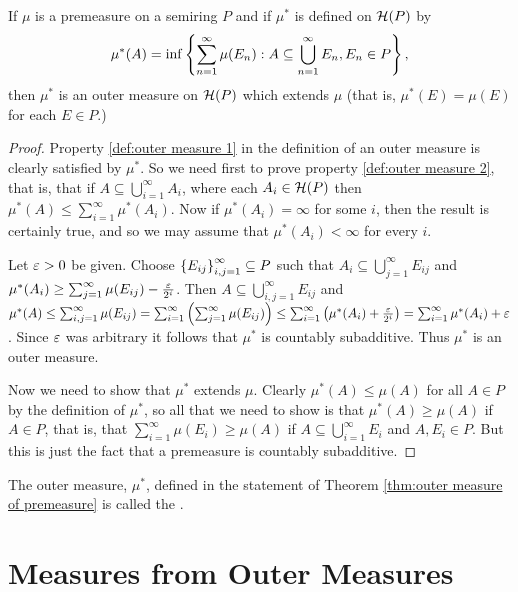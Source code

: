 \begin{theorem}\label{thm:outer measure of premeasure}
If $\mu$ is a premeasure on a semiring $P$ and if $\mu^*$ is defined on ${\cal H}(P)$ by \[\mu^*(A)=\inf\left\{\sum_{n=1}^\infty\mu(E_n):A\subseteq\bigcup_{n=1}^\infty E_n,E_n\in P\right\},\] then $\mu^*$ is an outer measure on ${\cal H}(P)$ which extends $\mu$ (that is, $\mu^*(E)=\mu(E)$ for each $E\in P$.)
\end{theorem}

\begin{proof}
Property \ref{def:outer measure 1} in the definition of an outer measure is clearly satisfied by $\mu^*$. So we need first to prove property \ref{def:outer measure 2}, that is, that if $A\subseteq\bigcup_{i=1}^\infty A_i$, where each $A_i\in{\cal H}(P)$ then $\mu^*(A)\leq\sum_{i=1}^\infty\mu^*(A_i)$. Now if $\mu^*(A_i)=\infty$ for some $i$, then the result is certainly true, and so we may assume that $\mu^*(A_i)<\infty$ for every $i$.

Let $\varepsilon>0$ be given. Choose $\left\{E_{ij}\right\}_{i, j=1}^\infty\subseteq P$ such that $A_i\subseteq\bigcup_{j=1}^\infty E_{ij}$ and $\mu^*(A_i)\geq\sum_{j=1}^\infty\mu(E_{ij})-\frac{\varepsilon}{2^i}$. Then $A\subseteq\bigcup_{i,j=1}^\infty E_{i j}$ and $\mu^*(A)\leq\sum_{i,j=1}^\infty\mu(E_{ij})=\sum_{i=1}^\infty\left(\sum_{j=1}^\infty\mu(E_{ij})\right)\leq\sum_{i=1}^\infty\left(\mu^*(A_i)+\frac{\varepsilon}{2^i}\right)\allowbreak=\sum_{i=1}^\infty\mu^*(A_i)+\varepsilon$. Since $\varepsilon$ was arbitrary it follows that $\mu^*$ is countably subadditive. Thus $\mu^*$ is an outer measure.

Now we need to show that $\mu^*$ extends $\mu$. Clearly $\mu^*(A)\leq\mu(A)$ for all $A\in P$ by the definition of $\mu^*$, so all that we need to show is that $\mu^*(A)\geq\mu(A)$ if $A\in P$, that is, that $\sum_{i=1}^\infty\mu(E_i)\geq\mu(A)$ if $A\subseteq\bigcup_{i=1}^\infty E_i$ and $A,E_i\in P$. But this is just the fact that a premeasure is countably subadditive.
\end{proof}

\begin{definition}
The outer measure, $\mu^*$, defined in the statement of Theorem \ref{thm:outer measure of premeasure} is called the .
\end{definition}

\section{Measures from Outer Measures}

